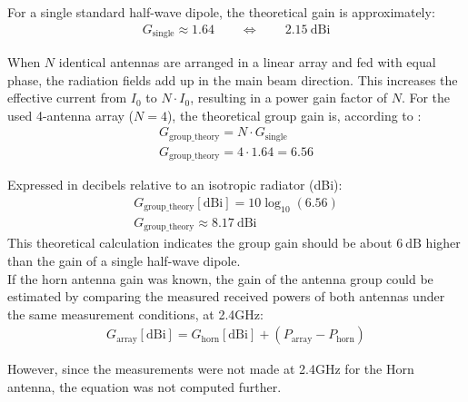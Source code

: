 For a single standard half-wave dipole, the theoretical gain is approximately:
\begin{gather}
	G_{\mathrm{single}} \approx 1.64 \qquad \Leftrightarrow \qquad 2.15\mathrm{\ dBi} \nonumber
\end{gather}

When $N$ identical antennas are arranged in a linear array and fed with equal phase, the radiation fields add up in the main beam direction. This increases the effective current from $I_0$ to $N \cdot I_0$, resulting in a power gain factor of $N$. For the used 4-antenna array ($N=4$), the theoretical group gain is, according to \cite{lec-script}:
\begin{gather}
	G_{\mathrm{group\_theory}} = N \cdot G_{\mathrm{single}} \nonumber \\
	G_{\mathrm{group\_theory}} = 4 \cdot 1.64 = 6.56 \label{eq:gain_linear}
\end{gather}

Expressed in decibels relative to an isotropic radiator (dBi):
\begin{gather}
	G_{\mathrm{group\_theory}}[\mathrm{dBi}] = 10\log_{10}(6.56) \nonumber \\
	\boxed{G_{\mathrm{group\_theory}} \approx 8.17\mathrm{\ dBi}} \label{eq:gain_db}
\end{gather}
This theoretical calculation indicates the group gain should be about $6\mathrm{\ dB}$ higher than the gain of a single half-wave dipole.\\

If the horn antenna gain was known, the gain of the antenna group could be estimated by comparing the measured received powers of both antennas under the same measurement conditions, at 2.4GHz:
\begin{gather}
	G_{\mathrm{array}}[\mathrm{dBi}] = G_{\mathrm{horn}}[\mathrm{dBi}] + \left(P_{\mathrm{array}} - P_{\mathrm{horn}}\right) \label{eq:array_gain}
\end{gather}

However, since the measurements were not made at 2.4GHz for the Horn antenna, the equation was not computed further.

